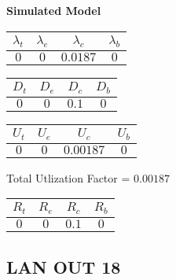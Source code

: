 \documentclass{article}
\begin{document}
\begin{minipage}{0.5\textwidth}
\centering	\textbf{Simulated Model}
\begin{table}[H]
\centering
\begin{tabular}{@{}cccc@{}}
\toprule
$\lambda_t$ & $\lambda_e$ & $\lambda_c$ & $\lambda_b$\\
\midrule
$0$ & $0$ & $0.0187$ & $0$\\
\bottomrule
\end{tabular}
\end{table}
\begin{table}[H]
\centering
\begin{tabular}{@{}cccc@{}}
\toprule
$D_t$ & $D_e$ & $D_c$ & $D_b$\\
\midrule
$0$ & $0$ & $0.1$ & $0$\\
\bottomrule
\end{tabular}
\end{table}\begin{table}[H]
\centering
\begin{tabular}{@{}cccc@{}}
\toprule
$U_t$ & $U_e$ & $U_c$ & $U_b$\\
\midrule
$0$ & $0$ & $0.00187$ & $0$\\
\bottomrule
\end{tabular}
\end{table}
\centering Total Utlization Factor = $0.00187$
\begin{table}[H]
\centering
\begin{tabular}{@{}cccc@{}}
\toprule
$R_t$ & $R_e$ & $R_c$ & $R_b$\\
\midrule
$0$ & $0$ & $0.1$ & $0$\\
\bottomrule
\end{tabular}
\end{table}
\end{minipage}\subsection{LAN OUT 18}
\end{document}
